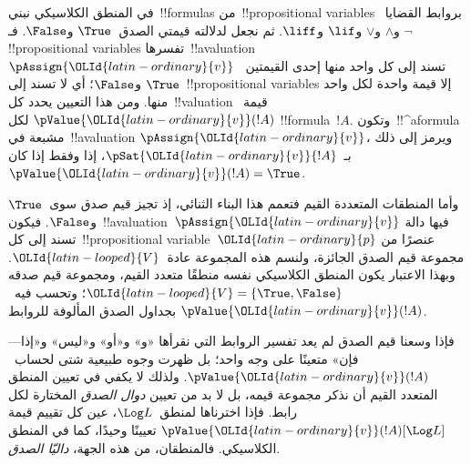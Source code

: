 \documentclass[../../../include/open-logic-section]{subfiles}
\begin{document}


في المنطق الكلاسيكي نبني~!!{formula}s من~!!{propositional variable}s
بروابط القضايا~$\lnot$ و$\land$ و$\lor$ و$\lif$ و$\liff$.
ثم نجعل لدلالته قيمتي الصدق~$\True$ و$\False$. فـ
  !!{propositional variable}s تفسرها~!!a{valuation}~$\pAssign{\OLId{latin-ordinary}{v}}$
  تسند إلى كل واحد منها إحدى القيمتين~$\True$ و$\False$؛ أي لا تسند
  إلى~!!{propositional variable}s إلا قيمة واحدة لكل واحد منها. ومن هذا
التعيين يحدد كل~!!{valuation} قيمة~$\pValue{\OLId{latin-ordinary}{v}}(!A)$ لكل
!!{formula}~$!A$. وتكون~!!^a{formula} مشبعة في~!!a{valuation}
$\pAssign{\OLId{latin-ordinary}{v}}$، ويرمز إلى ذلك بـ~$\pSat{\OLId{latin-ordinary}{v}}{!A}$، إذا وفقط إذا كان
$\pValue{\OLId{latin-ordinary}{v}}(!A) = \True$.

وأما المنطقات المتعددة القيم فتعمم هذا البناء الثنائي، إذ تجيز قيم
صدق سوى~$\True$ و$\False$. فيكون~!!a{valuation}~$\pAssign{\OLId{latin-ordinary}{v}}$ فيها
دالة تسند إلى كل~!!{propositional variable}~$\OLId{latin-ordinary}{p}$ عنصرًا من مجموعة
قيم الصدق الجائزة، ولنسم هذه المجموعة عادة~$\OLId{latin-looped}{V}$. وبهذا الاعتبار يكون
المنطق الكلاسيكي نفسه منطقًا متعدد القيم، ومجموعة قيم صدقه
$\OLId{latin-looped}{V} = \{\True, \False\}$؛ وتحسب فيه~$\pValue{\OLId{latin-ordinary}{v}}(!A)$ بجداول الصدق
المألوفة للروابط.


فإذا وسعنا قيم الصدق لم يعد تفسير الروابط التي نقرأها «و» و«أو»
و«ليس» و«إذا---فإن» متعينًا على وجه واحد؛ بل ظهرت وجوه طبيعية شتى
لحساب~$\pValue{\OLId{latin-ordinary}{v}}(!A)$. ولذلك لا يكفي في تعيين المنطق المتعدد القيم
أن نذكر مجموعة قيمه، بل لا بد من تعيين \emph{دوال الصدق} المختارة
لكل رابط. فإذا اخترناها لمنطق~$\Log L$، عين كل تقييم قيمة
$\pValue{\OLId{latin-ordinary}{v}}(!A)[\Log L]$ تعيينًا وحيدًا، كما في المنطق الكلاسيكي.
فالمنطقان، من هذه الجهة، \emph{داليّا الصدق}.
\end{document}
